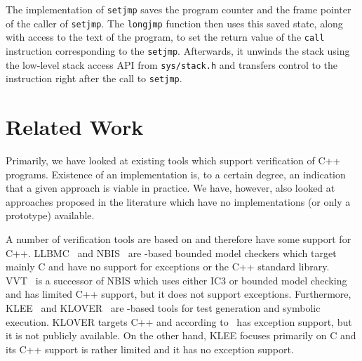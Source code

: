 The \divine{} implementation of \texttt{setjmp} saves the program counter
and the frame pointer of the caller of \texttt{setjmp}. The
\texttt{longjmp} function then uses this saved state, along with access
to the text of the program, to set the return value of the \texttt{call}
instruction corresponding to the \texttt{setjmp}. Afterwards, it unwinds
the stack using the low-level stack access API from \texttt{sys/stack.h}
and transfers control to the instruction right after the call to
\texttt{setjmp}.

\section{Related Work}\label{sec:related}

Primarily, we have looked at existing tools which support verification
of C++ programs. Existence of an implementation is, to a certain degree,
an indication that a given approach is viable in practice. We have,
however, also looked at approaches proposed in the literature which have
no implementations (or only a prototype) available.

A number of verification tools are based on \llvm{} and therefore have some
support for C++. LLBMC~\cite{sinz12:llbmc} and
NBIS~\cite{gunther14:increm.bounded} are \llvm{}-based bounded model
checkers which target mainly C and have no support for exceptions or the
C++ standard library. VVT~\cite{gunther16:vienna.verific.tool} is a
successor of NBIS which uses either IC3 or bounded model checking and
has limited C++ support, but it does not support exceptions.
Furthermore, KLEE~\cite{cadar08:klee} and KLOVER~\cite{li11:klover}
are \llvm{}-based tools for test generation and symbolic execution. KLOVER
targets C++ and according to~\cite{li11:klover} has exception support,
but it is not publicly available. On the other hand, KLEE focuses
primarily on C and its C++ support is rather limited and it has no
exception support.

